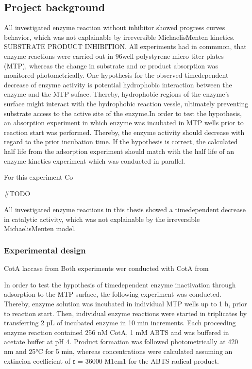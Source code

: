\documentclass[letterpaper,10pt,english]{jupyterBook}
\begin{document}
\subsection{Project background}
\label{\detokenize{scenarios/enzyme_inactivation:project-background}}
\sphinxAtStartPar
All investigated enzyme reaction without inhibitor showed progress curves behavior, which was not explainable by irreversible Michaelis\sphinxhyphen{}Menten kinetics. SUBSTRATE PRODUCT INHIBITION. All experiments had in commmon, that enzyme reactions were carried out in 96\sphinxhyphen{}well polystyrene micro titer plates (MTP), whereas the change in substrate and or product absorption was monitored photometrically.
One hypothesis for the observed time\sphinxhyphen{}dependent decrease of enzyme activity is potential hydrophobic interaction between the enzyme and the MTP suface. Thereby, hydrophobic regions of the enzyme’s surface might interact with the hydrophobic reaction vessle, ultimately preventing substrate access to the active site of the enzyme.In order to test the hypothesis, an absorption experiment in which enzyme was incubated in MTP wells prior to reaction start was performed. Thereby, the enzyme activity should decrease with regard to the prior incubation time. If the hypothesis is correct, the calculated half life from the adsorption experiment
should match with the half life of an enzyme kinetics experiment which was conducted in parallel.

\sphinxAtStartPar
For this experiment Co

\sphinxAtStartPar
{} \#TODO

\sphinxAtStartPar
All investigated enzyme reactions in this thesis showed a time\sphinxhyphen{}dependent decrease in catalytic activity, which was not explainable by the irreversible Michaelis\sphinxhyphen{}Menten model.


\subsubsection{Experimental design}
\label{\detokenize{scenarios/enzyme_inactivation:experimental-design}}
\sphinxAtStartPar
CotA laccase from 
Both experiments wer conducted with CotA from

\sphinxAtStartPar
{}In order to test the hypothesis of time\sphinxhyphen{}dependent enzyme inactivation through adsorption to the MTP surface, the following experiment was conducted. Thereby, enzyme solution was incubated in individual MTP wells up to 1 h, prior to reaction start.  Then, individual enzyme reactions were started in triplicates by transferring 2 µL of incubated enzyme in 10 min increments. Each proceeding enzyme reaction contained 256 nM CotA, 1 mM ABTS and was buffered in acetate buffer at pH 4. Product formation was followed photometrically at 420 nm and 25°C for 5 min, whereas concentrations were calculated assuming an extincion coefficient of ε = 36000 M\sphinxhyphen{}1cm\sphinxhyphen{}1 for the ABTS radical product.
\end{document}
